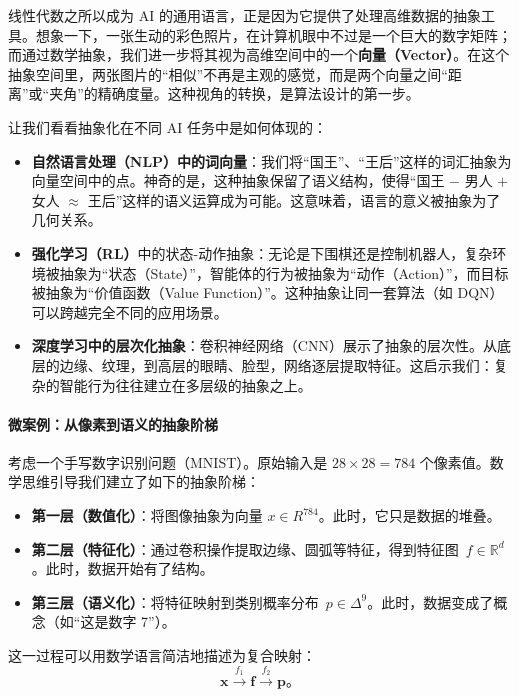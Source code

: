 线性代数之所以成为 AI 的通用语言，正是因为它提供了处理高维数据的抽象工具。想象一下，一张生动的彩色照片，在计算机眼中不过是一个巨大的数字矩阵；而通过数学抽象，我们进一步将其视为高维空间中的一个\textbf{向量（Vector）}。在这个抽象空间里，两张图片的“相似”不再是主观的感觉，而是两个向量之间“距离”或“夹角”的精确度量。这种视角的转换，是算法设计的第一步。

让我们看看抽象化在不同 AI 任务中是如何体现的：

\begin{itemize} 
  \item \textbf{自然语言处理（NLP）中的词向量}：我们将“国王”、“王后”这样的词汇抽象为向量空间中的点。神奇的是，这种抽象保留了语义结构，使得“国王 $-$ 男人 $+$ 女人 $\approx $  王后”这样的语义运算成为可能。这意味着，语言的意义被抽象为了几何关系。 
  \item \textbf{强化学习（RL）}中的状态-动作抽象：无论是下围棋还是控制机器人，复杂环境被抽象为“状态（State）”，智能体的行为被抽象为“动作（Action）”，而目标被抽象为“价值函数（Value Function）”。这种抽象让同一套算法（如 DQN）可以跨越完全不同的应用场景。 
  \item \textbf{深度学习中的层次化抽象}：卷积神经网络（CNN）展示了抽象的层次性。从底层的边缘、纹理，到高层的眼睛、脸型，网络逐层提取特征。这启示我们：复杂的智能行为往往建立在多层级的抽象之上。 
\end{itemize}

\paragraph{微案例：从像素到语义的抽象阶梯}

考虑一个手写数字识别问题（MNIST）。原始输入是 $28\times 28=784$ 个像素值。数学思维引导我们建立了如下的抽象阶梯：

\begin{itemize} 
  \item \textbf{第一层（数值化）}：将图像抽象为向量 $x\in R^{784}$。此时，它只是数据的堆叠。 
 \item \textbf{第二层（特征化）}：通过卷积操作提取边缘、圆弧等特征，得到特征图~$f\in \mathbb{ R}^d$。此时，数据开始有了结构。 
 \item \textbf{第三层（语义化）}：将特征映射到类别概率分布~$p\in \Delta^9 $。此时，数据变成了概念（如“这是数字 7”）。 
\end{itemize}

这一过程可以用数学语言简洁地描述为复合映射：
$$
\mathbf{x} \xrightarrow{f_1} \mathbf{f} \xrightarrow{f_2} \mathbf{p}。
$$

